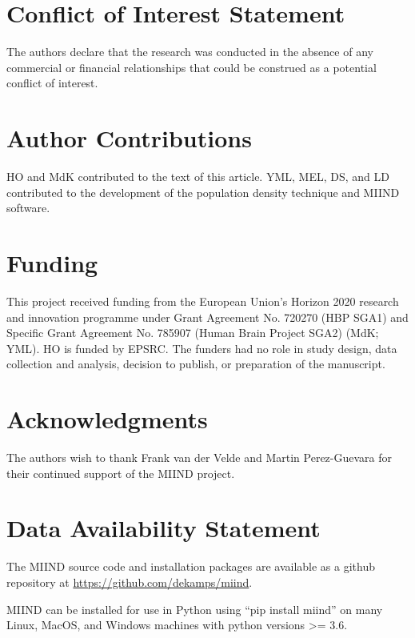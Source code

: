 \documentclass[utf8]{frontiersSCNS} %
\begin{document}
\section*{Conflict of Interest Statement}

The authors declare that the research was conducted in the absence of any commercial or financial relationships that could be construed as a potential conflict of interest.

\section*{Author Contributions}

HO and MdK contributed to the text of this article. YML, MEL, DS, and LD contributed to the development of the population density technique and MIIND software.  

\section*{Funding}
This project received funding from the European Union’s Horizon 2020 research and innovation programme under Grant Agreement No. 720270 (HBP SGA1) and Specific Grant Agreement No. 785907 (Human Brain Project SGA2) (MdK; YML). HO is funded by EPSRC. The funders had no role in study design, data collection and analysis, decision to publish, or preparation of the manuscript.

\section*{Acknowledgments}
The authors wish to thank Frank van der Velde and Martin Perez-Guevara for their continued support of the MIIND project.

\section*{Data Availability Statement}
The MIIND source code and installation packages are available as a github repository at \url{https://github.com/dekamps/miind}.

MIIND can be installed for use in Python using ``pip install miind'' on many Linux, MacOS, and Windows machines with python versions \textgreater= 3.6.
\end{document}
